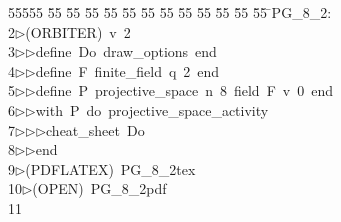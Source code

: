 %
%
\begin{tabbing}
55555 \= 55 \= 55 \= 55 \= 55 \= 55 \= 55 \= 55 \= 55 \= 55 \= 55 \= 55 \= 55 \= \>PG\_8\_2:\\[0pt]
2\>$\triangleright$\>(ORBITER)\ v\ 2\ \\[0pt]
3\>$\triangleright$\>$\triangleright$\>define\ Do\ draw\_options\ end\ \\[0pt]
4\>$\triangleright$\>$\triangleright$\>define\ F\ finite\_field\ q\ 2\ end\ \\[0pt]
5\>$\triangleright$\>$\triangleright$\>define\ P\ projective\_space\ n\ 8\ field\ F\ v\ 0\ end\ \\[0pt]
6\>$\triangleright$\>$\triangleright$\>with\ P\ do\ projective\_space\_activity\ \\[0pt]
7\>$\triangleright$\>$\triangleright$\>$\triangleright$\>cheat\_sheet\ Do\ \\[0pt]
8\>$\triangleright$\>$\triangleright$\>end\\[0pt]
9\>$\triangleright$\>(PDFLATEX)\ PG\_8\_2tex\ \\[0pt]
10\>$\triangleright$\>(OPEN)\ PG\_8\_2pdf\\[0pt]
11\>\end{tabbing}
